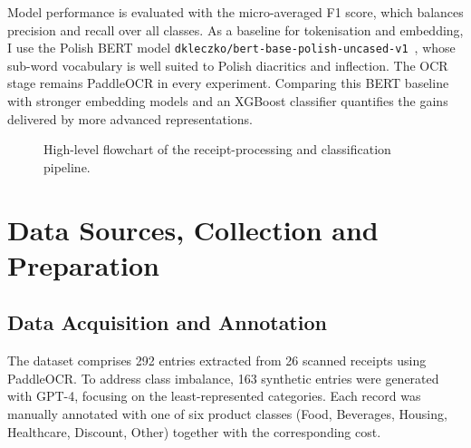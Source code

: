 \documentclass{SGGW-thesis-EN}
\begin{document}
Model performance is evaluated with the micro-averaged F1 score, which balances precision and recall
over all classes.  As a baseline for tokenisation and embedding, I use the Polish BERT model
\texttt{dkleczko/bert-base-polish-uncased-v1}~\cite{kleczek2020polbert},
whose sub-word vocabulary is well suited to Polish diacritics and inflection.  The OCR stage remains PaddleOCR in every
experiment. Comparing this BERT baseline with stronger embedding models and an XGBoost classifier quantifies the gains delivered by more advanced
representations.

\begin{figure}
  \centering
  \caption{High-level flowchart of the receipt-processing and classification pipeline.}
  \label{fig:pipeline_flowchart_vertical}
\end{figure}



\section{Data Sources, Collection and Preparation}

\subsection{Data Acquisition and Annotation}
The dataset comprises 292 entries extracted from 26 scanned receipts using PaddleOCR.
To address class imbalance, 163 synthetic entries were generated with GPT-4, focusing on the least-represented categories. 
Each record was manually annotated with one of six product classes (Food, Beverages, Housing, Healthcare, Discount, Other) together
with the corresponding cost.
\end{document}
